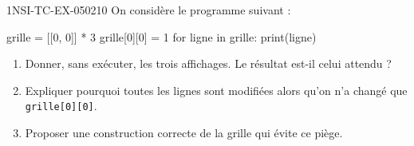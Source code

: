 \begin{exercice}{1NSI-TC-EX-050}{2}{10}
On considère le programme suivant :
\begin{python}
grille = [[0, 0]] * 3
grille[0][0] = 1
for ligne in grille:
    print(ligne)
\end{python}
\begin{enumerate}
  \item Donner, sans exécuter, les trois affichages. Le résultat est-il celui
        attendu ?
  \item Expliquer pourquoi toutes les lignes sont modifiées alors qu'on n'a changé
        que \lstinline{grille[0][0]}.
  \item Proposer une construction correcte de la grille qui évite ce piège.
\end{enumerate}
\end{exercice}
